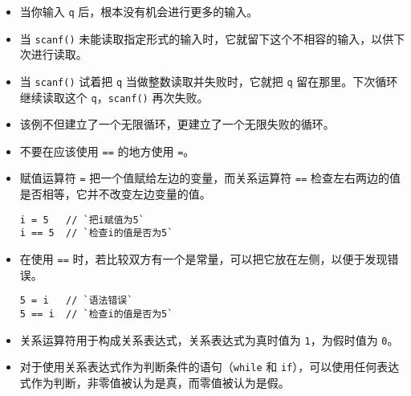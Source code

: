 \begin{frame}[fragile]
\begin{itemize}
\item
当你输入 \lstinline|q| 后，根本没有机会进行更多的输入。\\[0.1in]
\item
当 \lstinline|scanf()| 未能读取指定形式的输入时，它就留下这个不相容的输入，以供下次进行读取。\\[0.1in]
\item
当 \lstinline|scanf()| 试着把 \lstinline|q| 当做整数读取并失败时，它就把 \lstinline|q| 留在那里。下次循环继续读取这个 \lstinline|q|，\lstinline|scanf()| 再次失败。\\[0.1in]
\item
该例不但建立了一个无限循环，更建立了一个无限失败的循环。
\end{itemize}
\end{frame}


\begin{frame}[fragile]
\begin{itemize}
\item
不要在应该使用 \lstinline|==| 的地方使用 \lstinline|=|。\\[0.1in]
\item
赋值运算符 \lstinline|=| 把一个值赋给左边的变量，而关系运算符 \lstinline|==| 检查左右两边的值是否相等，它并不改变左边变量的值。
\begin{lstlisting}
i = 5   // `把i赋值为5`
i == 5  // `检查i的值是否为5`
\end{lstlisting}
\item
在使用 \lstinline|==| 时，若比较双方有一个是常量，可以把它放在左侧，以便于发现错误。
\begin{lstlisting}
5 = i   // `语法错误`
5 == i  // `检查i的值是否为5`
\end{lstlisting}
\end{itemize}
\end{frame}


\begin{frame}[fragile]
\begin{itemize}
\item 关系运算符用于构成关系表达式，关系表达式为真时值为 \lstinline|1|，为假时值为 \lstinline|0|。\\[0.1in]
\item 对于使用关系表达式作为判断条件的语句（\lstinline|while| 和 \lstinline|if|），可以使用任何表达式作为判断，非零值被认为是真，而零值被认为是假。
\end{itemize}
\end{frame}


